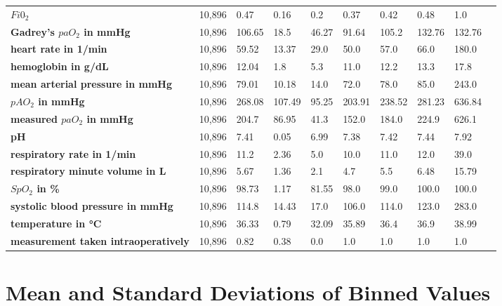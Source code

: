 \documentclass[referee,lineno,pdflatex,sn-nature]{sn-jnl}%
\theoremstyle{thmstyleone}%
\theoremstyle{thmstyletwo}%
\theoremstyle{thmstylethree}%
\begin{document}
\begin{appendices}
\begin{table}
\begin{tabularx}{\textwidth}{@{} L lllllllll @{}}
        \textbf{\footnotemark[2]$Fi0_2$} & 10,896 & 0.47 & 0.16 & 0.2 & 0.37 & 0.42 & 0.48 & 1.0 \\ 
        \textbf{\footnotemark[2]Gadrey’s $paO_2$ in mmHg} & 10,896 & 106.65 & 18.5 & 46.27 & 91.64 & 105.2 & 132.76 & 132.76 \\ 
        \textbf{\footnotemark[2]heart rate in 1/min} & 10,896 & 59.52 & 13.37 & 29.0 & 50.0 & 57.0 & 66.0 & 180.0 \\ 
        \textbf{\footnotemark[2]hemoglobin in g/dL} & 10,896 & 12.04 & 1.8 & 5.3 & 11.0 & 12.2 & 13.3 & 17.8 \\ 
        \textbf{\footnotemark[2]mean arterial pressure in mmHg} & 10,896 & 79.01 & 10.18 & 14.0 & 72.0 & 78.0 & 85.0 & 243.0 \\ 
        \textbf{\footnotemark[2]$pAO_2$ in mmHg} & 10,896 & 268.08 & 107.49 & 95.25 & 203.91 & 238.52 & 281.23 & 636.84 \\ 
        \textbf{\footnotemark[2]measured $paO_2$ in mmHg} & 10,896 & 204.7 & 86.95 & 41.3 & 152.0 & 184.0 & 224.9 & 626.1 \\ 
        \textbf{\footnotemark[2]pH} & 10,896 & 7.41 & 0.05 & 6.99 & 7.38 & 7.42 & 7.44 & 7.92 \\ 
        \textbf{\footnotemark[2]respiratory rate in 1/min} & 10,896 & 11.2 & 2.36 & 5.0 & 10.0 & 11.0 & 12.0 & 39.0 \\ 
        \textbf{\footnotemark[2]respiratory minute volume in L} & 10,896 & 5.67 & 1.36 & 2.1 & 4.7 & 5.5 & 6.48 & 15.79 \\ 
        \textbf{\footnotemark[2]$SpO_2$ in \%} & 10,896 & 98.73 & 1.17 & 81.55 & 98.0 & 99.0 & 100.0 & 100.0 \\ 
        \textbf{\footnotemark[2]systolic blood pressure in mmHg} & 10,896 & 114.8 & 14.43 & 17.0 & 106.0 & 114.0 & 123.0 & 283.0 \\ 
        \textbf{\footnotemark[2]temperature in °C} & 10,896 & 36.33 & 0.79 & 32.09 & 35.89 & 36.4 & 36.9 & 38.99 \\ 
        \textbf{\footnotemark[2]measurement taken intraoperatively} & 10,896 & 0.82 & 0.38 & 0.0 & 1.0 & 1.0 & 1.0 & 1.0 \\ \hline
    \end{tabularx}
\end{table}


\section{Mean and Standard Deviations of Binned Values}\label{secA9}


\end{appendices}
\end{document}
